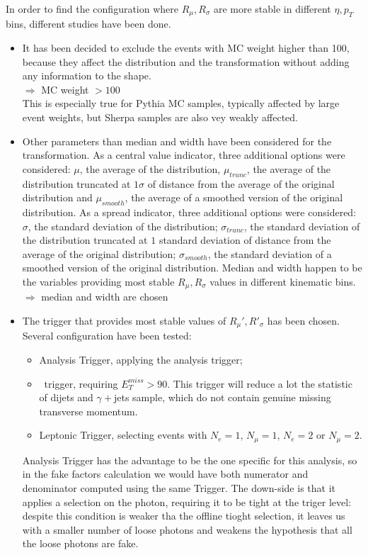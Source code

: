 In order to find the configuration where $R_\mu, R_\sigma$ are more stable in different $\eta, p_T$ bins, different studies have been done. 
 \begin{itemize}
     \item It has been decided to exclude the events with MC weight higher than 100, because they affect the distribution and the transformation without adding any information to the shape. \\
       $\Longrightarrow$ MC weight $>100 $ \\
       This is especially true for Pythia MC samples, typically affected by large event weights, but Sherpa samples are also vey weakly affected.
     \item Other parameters than median and width have been considered for the transformation. As a central value indicator, three additional options were considered: $\mu$, the average of the distribution, $\mu_{trunc}$, the average of the distribution truncated at $1\sigma$ of distance from the average of the original distribution and $\mu_{smooth}$, the average of a smoothed version of the original distribution. As a spread indicator, three additional options were considered: $\sigma$, the standard deviation of the distribution; $\sigma_{trunc}$, the standard deviation of the distribution truncated at $1$ standard deviation of distance from the average of the original distribution; $\sigma_{smooth}$, the standard deviation of a smoothed version of the original distribution. Median and width happen to be the variables providing most stable $R_\mu, R_\sigma$ values in different kinematic bins. \\
     $\Longrightarrow$ median and width are chosen 
     \item The trigger that provides most stable values of $R_\mu', R'_\sigma$ has been chosen. Several configuration have been tested: 
\begin{itemize}
    \item Analysis Trigger, applying the analysis trigger; 
    \item \ETmiss\ trigger, requiring $E_T^{miss}>90$. This trigger will reduce a lot the statistic of dijets and $\gamma+$jets sample, which do not contain genuine missing transverse momentum.
  \item Leptonic Trigger, selecting events with $N_{e} = 1$, $N_\mu = 1$, $N_{e} = 2$ or $N_{\mu} = 2$. 
  \end{itemize}
  
Analysis Trigger has the advantage to be the one specific for this analysis, so in the fake factors calculation we would have both numerator and denominator computed using the same Trigger. The down-side is that it applies a selection on the photon, requiring it to be tight at the triger level: despite this condition is weaker tha the offline tioght selection, it leaves us with a smaller number of loose photons and weakens the hypothesis that all the loose photons are fake.


\end{itemize}

